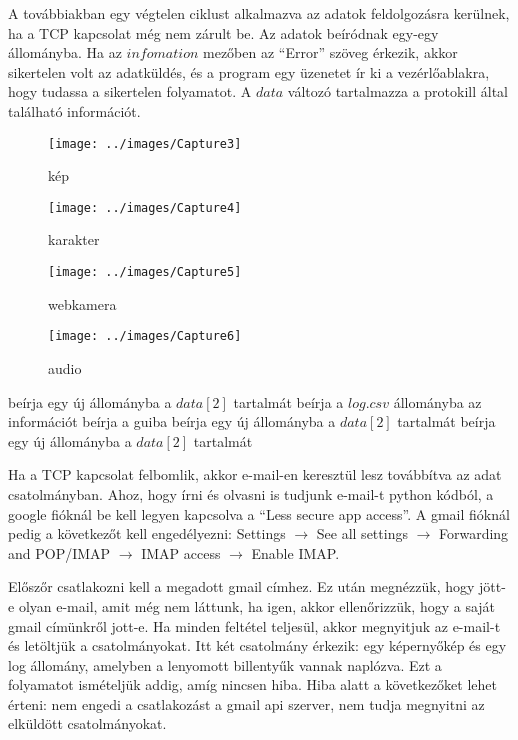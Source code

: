 \documentclass[a4paper, 11pt]{article}
\begin{document}
A továbbiakban egy végtelen ciklust alkalmazva az adatok feldolgozásra kerülnek, ha a TCP kapcsolat még nem zárult be. Az adatok beíródnak egy-egy állományba. Ha az $infomation$ mezőben az ``Error'' szöveg érkezik, akkor sikertelen volt az adatküldés, és a program egy üzenetet ír ki a vezérlőablakra, hogy tudassa a sikertelen folyamatot. A $data$ változó tartalmazza a protokill által található információt.
\begin{figure}[H]
\centering
\texttt{[image: ../images/Capture3]}
\caption{kép}
\label{fig:imgprocess}
\end{figure}
\begin{figure}[H]
\centering
\texttt{[image: ../images/Capture4]}
\caption{karakter}
\label{fig:charprocess}
\end{figure}
\begin{figure}[H]
\centering
\texttt{[image: ../images/Capture5]}
\caption{webkamera}
\label{fig:webcamprocess}
\end{figure}
\begin{figure}[H]
\centering
\texttt{[image: ../images/Capture6]}
\caption{audio}
\label{fig:audioprocess}
\end{figure}

\begin{algorithmic}[H]
		\State beírja egy új állományba a $data[2]$ tartalmát
	\EndIf
{}
	\State beírja a $log.csv$ állományba az információt
		\State beírja a guiba
	\EndIf
{}
		\State beírja egy új állományba a $data[2]$ tartalmát
	\EndIf
{}
		\State beírja egy új állományba a $data[2]$ tartalmát
	\EndIf
\EndIf
\end{algorithmic}

Ha a TCP kapcsolat felbomlik, akkor e-mail-en keresztül lesz továbbítva az adat csatolmányban. Ahoz, hogy írni és olvasni is tudjunk e-mail-t python kódból, a google fióknál be kell legyen kapcsolva a ``Less secure app access''. A gmail fióknál pedig a következőt kell engedélyezni: Settings $\rightarrow$ See all settings $\rightarrow$ Forwarding and POP/IMAP $\rightarrow$ IMAP access $\rightarrow$ Enable IMAP.

Előszőr csatlakozni kell a megadott gmail címhez. Ez után megnézzük, hogy jött-e olyan e-mail, amit még nem láttunk, ha igen, akkor ellenőrizzük, hogy a saját gmail címünkről jott-e. Ha minden feltétel teljesül, akkor megnyitjuk az e-mail-t és letöltjük a csatolmányokat. Itt két csatolmány érkezik: egy képernyőkép és egy log állomány, amelyben a lenyomott billentyűk vannak naplózva. Ezt a folyamatot ismételjük addig, amíg nincsen hiba. Hiba alatt a következőket lehet érteni: nem engedi a csatlakozást a gmail api szerver, nem tudja megnyitni az elküldött csatolmányokat.
\end{document}
